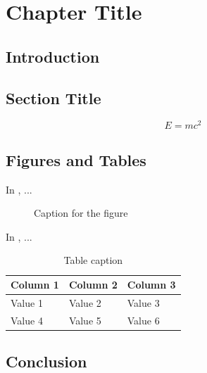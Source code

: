 \chapter{Chapter Title}

\section{Introduction}

\section{Section Title}

\begin{equation}
    E = mc^2
    \label{eq:example}
\end{equation}


\section{Figures and Tables}

In , ...

\begin{figure}[H]
    \centering
    \caption[Short caption]{Caption for the figure}
    \label{fig:example}
\end{figure}

In , ...

\begin{table}[H]
    \centering
    \caption{Table caption}
    \label{tab:example}
    \begin{tabular}{lll}
        \toprule
        Column 1 & Column 2 & Column 3 \\
        \midrule
        Value 1  & Value 2  & Value 3  \\
        Value 4  & Value 5  & Value 6  \\
        \bottomrule
    \end{tabular}
\end{table}

\section{Conclusion}
